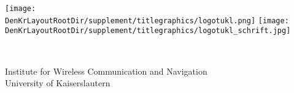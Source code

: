 %
%
%
\begin{minipage}{\textwidth}%
\begin{flushleft}%
\texttt{[image: \\DenKrLayoutRootDir/supplement/titlegraphics/logotukl.png]}%
\hspace*{1em}%
\texttt{[image: \\DenKrLayoutRootDir/supplement/titlegraphics/logotukl\_schrift.jpg]}%
\textsc{\Large }%
\end{flushleft}%
\end{minipage}%
\hfill%
\begin{minipage}{0.5\textwidth}%
\begin{flushright}%
\end{flushright}%
\end{minipage}%
\\%
%
\vspace*{0.05\textheight}%
%

%
\vfill\vfill%
{\large\sffamily Institute for Wireless Communication and Navigation}\\%
{\large\sffamily University of Kaiserslautern}%
%

%
%